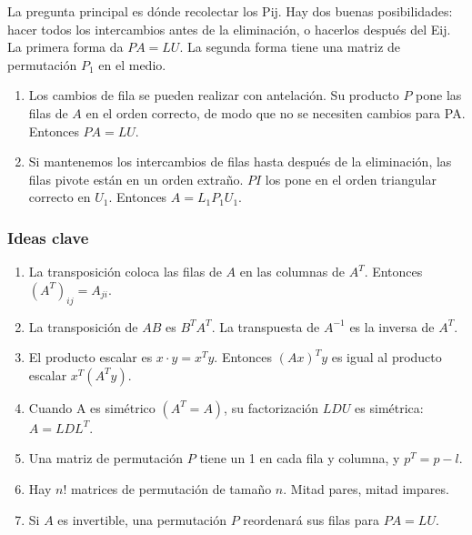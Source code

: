 La pregunta principal es dónde recolectar los Pij. Hay dos buenas posibilidades: hacer todos los intercambios antes de la eliminación, o hacerlos después del Eij. La primera forma da
$P A = L U$. La segunda forma tiene una matriz de permutación $P_1$ en el medio.

\begin{enumerate}
	\item Los cambios de fila se pueden realizar con antelación. Su producto $P$ pone las filas de $A$ en
	      el orden correcto, de modo que no se necesiten cambios para PA. Entonces $PA = L U$.
	\item Si mantenemos los intercambios de filas hasta después de la eliminación, las filas pivote están en un orden extraño.
	      $PI$ los pone en el orden triangular correcto en $U_1$. Entonces $A=L_1P_1U_1$.
\end{enumerate}

\subsubsection{Ideas clave}

\begin{enumerate}
	\item La transposición coloca las filas de $A$ en las columnas de $A^T$. Entonces $(A^T)_{ij}=A_{ji}$.
	\item La transposición de $AB$ es $B^TA^T$. La transpuesta de $A^{-1}$ es la inversa de $A^T$.
	\item El producto escalar es $x\cdot y= x^Ty$. Entonces $(Ax)^T y$ es igual al producto escalar $x^T(A^Ty)$.
	\item Cuando A es simétrico $(A^T = A)$, su factorización $LDU$ es simétrica: $A = LDL^T$.
	\item Una matriz de permutación $P$ tiene un 1 en cada fila y columna, y $p^T = p-l$.
	\item Hay $n!$ matrices de permutación de tamaño $n$. Mitad pares, mitad impares.
	\item Si $A$ es invertible, una permutación $P$ reordenará sus filas para $PA=LU$.
\end{enumerate}